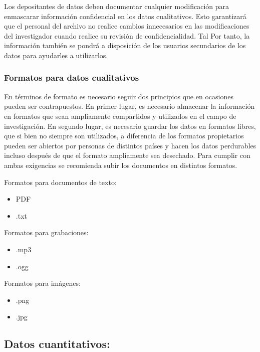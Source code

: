 \documentclass[
  14pt,
]{book}
\begin{document}
Los depositantes de datos deben documentar cualquier modificación para enmascarar información confidencial en los datos cualitativos. Esto garantizará que el personal del archivo no realice cambios innecesarios en las modificaciones del investigador cuando realice su revisión de confidencialidad. Tal
Por tanto, la información también se pondrá a disposición de los usuarios secundarios de los datos para ayudarles a utilizarlos.

\hypertarget{formatos-para-datos-cualitativos}{%
\subsubsection{Formatos para datos cualitativos}\label{formatos-para-datos-cualitativos}}

En términos de formato es necesario seguir dos principios que en ocasiones pueden ser contrapuestos. En primer lugar, es necesario almacenar la información en formatos que sean ampliamente compartidos y utilizados en el campo de investigación. En segundo lugar, es necesario guardar los datos en formatos libres, que si bien no siempre son utilizados, a diferencia de los formatos propietarios pueden ser abiertos por personas de distintos países y hacen los datos perdurables incluso después de que el formato ampliamente sea desechado. Para cumplir con ambas exigencias se recomienda subir los documentos en distintos formatos.

Formatos para documentos de texto:

\begin{itemize}
\item
  PDF
\item
  .txt
\end{itemize}

Formatos para grabaciones:

\begin{itemize}
\item
  .mp3
\item
  .ogg
\end{itemize}

Formatos para imágenes:

\begin{itemize}
\item
  .png
\item
  .jpg
\end{itemize}

\hypertarget{datos-cuantitativos}{%
\subsection{Datos cuantitativos:}\label{datos-cuantitativos}}
\end{document}

